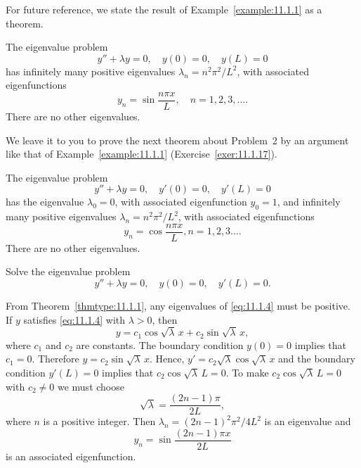 For future reference, we state the result of Example~\ref{example:11.1.1} as a theorem.

\begin{theorem}
  \color{blue}
  \label{thmtype:11.1.2} The eigenvalue problem
  \[
    y''+\lambda y=0,\quad y(0)=0,\quad y(L)=0
  \]
  has infinitely many positive eigenvalues $\lambda_{n}=n^{2}\pi^{2}/L^{2}$, with associated
  eigenfunctions
  \[
    y_{n}=\sin\frac{n\pi x}{L},\quad n=1,2,3,\dots.
  \]
  There are no other eigenvalues.
\end{theorem}

We leave it to you to prove the next theorem about Problem~2 by an argument like that of
Example~\ref{example:11.1.1} (Exercise~\ref{exer:11.1.17}).

\begin{theorem}
  \color{blue}
  \label{thmtype:11.1.3} The eigenvalue problem
  \[
    y''+\lambda y=0,\quad y'(0)=0,\quad y'(L)=0
  \]
  has the eigenvalue $\lambda_{0}=0$, with associated eigenfunction $y_{0}=1$, and infinitely many
  positive eigenvalues $\lambda_{n}=n^{2}\pi^{2}/L^{2}$, with associated eigenfunctions
  \[
    y_{n}=\cos\frac{n\pi x}{L},n=1,2,3\dots.
  \]
  There are no other eigenvalues.
\end{theorem}

\begin{example}[Problem 3]
  \label{example:11.1.2} \rm Solve the eigenvalue problem
  \begin{equation}
    \label{eq:11.1.4}y''+\lambda y=0,\quad y(0)=0,\quad y'(L)=0.
  \end{equation}

  \solution From Theorem~\ref{thmtype:11.1.1}, any eigenvalues of \eqref{eq:11.1.4} must be
  positive. If $y$ satisfies \eqref{eq:11.1.4} with $\lambda>0$, then
  \[
    y=c_{1}\cos\sqrt{\lambda}\,x+c_{2}\sin\sqrt{\lambda}\,x,
  \]
  where $c_{1}$ and $c_{2}$ are constants. The boundary condition $y(0)=0$ implies that $c_{1}=0$.
  Therefore $y=c_{2}\sin\sqrt{\lambda}\,x$. Hence, $y'=c_{2}\sqrt{\lambda}\cos\sqrt{\lambda}\,x$ and
  the boundary condition $y'(L)=0$ implies that $c_{2}\cos\sqrt{\lambda}\,L=0$. To make
  $c_{2}\cos\sqrt{\lambda}\,L=0$ with $c_{2}\ne0$ we must choose
  \[
    \sqrt{\lambda}=\frac{(2n-1)\pi}{2L},
  \]
  where $n$ is a positive integer. Then $\lambda_{n}=(2n-1)^{2}\pi^{2}/4L^{2}$ is an eigenvalue and
  \[
    y_{n}=\sin\frac{(2n-1)\pi x}{2L}
  \]
  is an associated eigenfunction. \bbox
\end{example}

